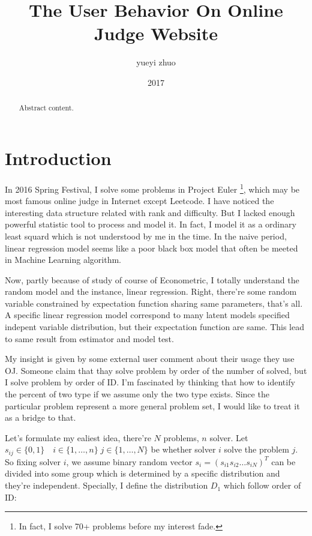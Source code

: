 \documentclass{article}
\title{The User Behavior On Online Judge Website}
\author{yueyi zhuo}
\date{2017}
\begin{document}
\maketitle

\begin{abstract}

Abstract content.

\end{abstract}

\section{Introduction}

In 2016 Spring Festival, I solve some problems in Project Euler 
\footnote{In fact, I solve 70+ problems before my interest fade.}, 
which may be most famous online judge 
in Internet except Leetcode. I have noticed the interesting data structure related with rank and difficulty.
But I lacked enough powerful statistic tool to process and model it. 
In fact, I model it as a ordinary least squard which is not understood by me in the time. In the naive period,
linear regression model seems like a poor black box model that often be meeted in Machine Learning algorithm.

Now, partly because of study of course of Econometric, I totally understand the random model and the instance,
linear regression. 
Right, there're some random variable constrained by expectation function sharing same parameters, that's all.
A specific linear regression model correspond to many latent models specified indepent variable distribution,
but their expectation function are same. This lead to same result from estimator and model test.

My insight is given by some external user comment about their usage they use OJ. 
Someone claim that thay solve problem by order of the number of solved, but I solve problem by order of ID.
I'm fascinated by thinking that how to identify the percent of two type if we assume only the two type exists.
Since the particular problem represent a more general problem set, I would like to treat it as a bridge to that.

Let's formulate my ealiest idea, there're $N$ problems, $n$ solver. Let 
$s_{ij} \in \{ 0,1 \} \quad i \in \{ 1,\dots,n \} \; j \in \{ 1,\dots,N \}$ be whether solver $i$ solve the problem $j$.
So fixing solver $i$, we assume binary random vector $s_i = ( s_{i1} s_{i2} \dots s_{iN} )^T$ 
can be divided into some group which is determined by a specific distribution and they're independent.
Specially, I define the distribution $D_1$ which follow order of ID:
\end{document}
